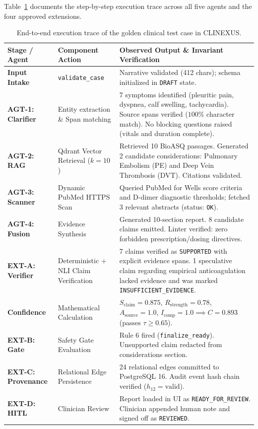 \documentclass[12pt,a4paper]{report}
\begin{document}
Table~\ref{tab:golden_trace} documents the step-by-step execution trace across all five agents and the four approved extensions.

\begin{table}[H]
\centering
\caption{End-to-end execution trace of the golden clinical test case in CLINEXUS.}
\label{tab:golden_trace}
\small
\begin{tabularx}{\textwidth}{lp{3.5cm}X}
\toprule
\textbf{Stage / Agent} & \textbf{Component Action} & \textbf{Observed Output \& Invariant Verification} \\
\midrule
\textbf{Input Intake} & \texttt{validate\_case} & Narrative validated (412 chars); schema initialized in \texttt{DRAFT} state. \\
\addlinespace[0.15cm]
\textbf{AGT-1: Clarifier} & Entity extraction \& Span matching & 7 symptoms identified (pleuritic pain, dyspnea, calf swelling, tachycardia). Source spans verified ($100\%$ character match). No blocking questions raised (vitals and duration complete). \\
\addlinespace[0.15cm]
\textbf{AGT-2: RAG} & Qdrant Vector Retrieval ($k=10$) & Retrieved 10 BioASQ passages. Generated 2 candidate considerations: Pulmonary Embolism (PE) and Deep Vein Thrombosis (DVT). Citations validated. \\
\addlinespace[0.15cm]
\textbf{AGT-3: Scanner} & Dynamic PubMed HTTPS Scan & Queried PubMed for Wells score criteria and D-dimer diagnostic thresholds; fetched 3 relevant abstracts (status: \texttt{OK}). \\
\addlinespace[0.15cm]
\textbf{AGT-4: Fusion} & Evidence Synthesis & Generated 10-section report. 8 candidate claims emitted. Linter verified: zero forbidden prescription/dosing directives. \\
\addlinespace[0.15cm]
\textbf{EXT-A: Verifier} & Deterministic + NLI Claim Verification & 7 claims verified as \texttt{SUPPORTED} with explicit evidence spans. 1 speculative claim regarding empirical anticoagulation lacked evidence and was marked \texttt{INSUFFICIENT\_EVIDENCE}. \\
\addlinespace[0.15cm]
\textbf{Confidence} & Mathematical Calculation & $S_{\text{claim}} = 0.875$, $R_{\text{strength}} = 0.78$, $A_{\text{source}} = 1.0$, $I_{\text{comp}} = 1.0 \implies C = 0.893$ (passes $\tau \ge 0.65$). \\
\addlinespace[0.15cm]
\textbf{EXT-B: Gate} & Safety Gate Evaluation & Rule 6 fired (\texttt{finalize\_ready}). Unsupported claim redacted from considerations section. \\
\addlinespace[0.15cm]
\textbf{EXT-C: Provenance} & Relational Edge Persistence & 24 relational edges committed to PostgreSQL 16. Audit event hash chain verified ($h_{12} = \text{valid}$). \\
\addlinespace[0.15cm]
\textbf{EXT-D: HITL} & Clinician Review & Report loaded in UI as \texttt{READY\_FOR\_REVIEW}. Clinician appended human note and signed off as \texttt{REVIEWED}. \\
\bottomrule
\end{tabularx}
\end{table}
\end{document}
